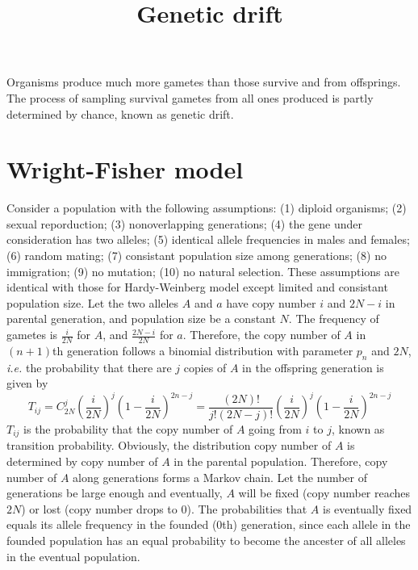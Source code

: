 \documentclass[11pt]{article}
\title{Genetic drift}
\author{}
\date{}
\begin{document}
\begin{sloppypar}
  \maketitle

  \linenumbers
Organisms produce much more gametes than those survive and from offsprings. 
The process of sampling survival gametes from all ones produced is partly determined by chance, known as genetic drift. 

\section{Wright-Fisher model}
Consider a population with the following assumptions: 
(1) diploid organisms; (2) sexual reporduction; (3) nonoverlapping generations; (4) the gene under consideration has two alleles; (5) identical allele frequencies in males and females; (6) random mating; (7) consistant population size among generations; (8) no immigration; (9) no mutation; (10) no natural selection. 
These assumptions are identical with those for Hardy-Weinberg model except limited and consistant population size. 
Let the two alleles $A$ and $a$ have copy number $i$ and $2N-i$ in parental generation, and population size be a constant $N$. 
The frequency of gametes is $\frac{i}{2N}$ for $A$, and $\frac{2N-i}{2N}$ for $a$. 
Therefore, the copy number of $A$ in $(n+1)$th generation follows a binomial distribution with parameter $p_n$ and $2N$, \textit{i.e.} the probability that there are $j$ copies of $A$ in the offspring generation is given by
\begin{equation}
  T_{ij} = C_{2N}^j (\frac{i}{2N})^j (1-\frac{i}{2N})^{2n-j} = \frac{(2N)!}{j!(2N-j)!} (\frac{i}{2N})^j (1-\frac{i}{2N})^{2n-j}
\end{equation}
$T_{ij}$ is the probability that the copy number of $A$ going from $i$ to $j$, known as transition probability. 
Obviously, the distribution copy number of $A$ is determined by copy number of $A$ in the parental population. 
Therefore, copy number of $A$ along generations forms a Markov chain. 
Let the number of generations be large enough and eventually, $A$ will be fixed (copy number reaches $2N$) or lost (copy number drops to 0). 
The probabilities that $A$ is eventually fixed equals its allele frequency in the founded (0th) generation, since each allele in the founded population has an equal probability to become the ancester of all alleles in the eventual population. 


\end{sloppypar}
\end{document}
